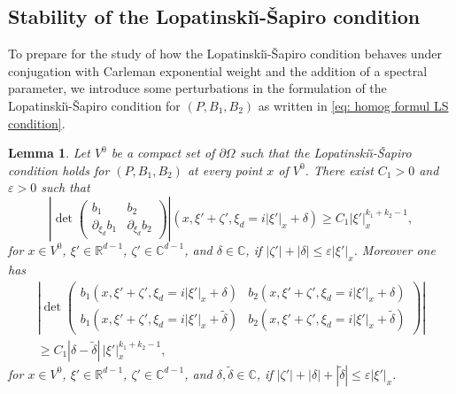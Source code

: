 \documentclass[10pt]{amsart}
\theoremstyle{plain}
\newtheorem{lemma}[theorem]{Lemma}
\theoremstyle{definition}
\def\R{\mathbb{R}}
\def\C{\mathbb{C}}
\newcommand{\LS}{Lopatinski\u{\i}-\v{S}apiro\xspace}
\let\eps\varepsilon
\begin{document}
\subsection{Stability of the \LS condition}
\label{sec: Stability LS}
To prepare for the study of how the \LS condition behaves under
conjugation with Carleman exponential weight and the addition of a
spectral parameter, we introduce some perturbations in the formulation
of the \LS condition for $(P, B_1, B_2)$ as written in \eqref{eq:
homog formul LS condition}.

\begin{lemma}
\label{lemma: perturbation LS}
Let $V^0$ be a compact set of $\partial\Omega$ such that the \LS
condition holds for $(P, B_1, B_2)$ at every point $x$ of $V^0$. There exist $C_1>0$
and $\eps>0$ such that
\begin{equation}\label{eq: LS + perturbation-1}
\left|\det
\begin{pmatrix}
b_1
&b_2\\[
2pt]
\partial_{\xi_d}b_1
& \partial_{\xi_d}b_2
\end{pmatrix}\right|(x,\xi' + \zeta', \xi_d = i |\xi'|_x+ \delta)
\geq C_1 |\xi'|_x^{k_1+k_2 -1},
\end{equation}
for $x \in V^0$, $\xi' \in \R^{d-1}$, $\zeta' \in \C^{d-1}$, and $\delta \in \C$, if $|\zeta'| + |\delta| \leq \eps |\xi'|_x$.
Moreover one has
\begin{multline}\label{eq: LS + perturbation-2}
\left|\det
\begin{pmatrix}
b_1 (x,\xi' + \zeta', \xi_d = i |\xi'|_x+ \delta)
&b_2 (x,\xi' + \zeta', \xi_d = i |\xi'|_x+ \delta)\\[
4pt]
b_1 (x,\xi' + \zeta', \xi_d = i |\xi'|_x+ \tilde{\delta})
& b_2 (x,\xi' + \zeta', \xi_d = i |\xi'|_x+ \tilde{\delta})
\end{pmatrix}\right|\\
\geq C_1 |\delta - \tilde{\delta}|\, |\xi'|_x^{k_1+k_2 -1},
\end{multline}
for $x \in V^0$, $\xi' \in \R^{d-1}$, $\zeta' \in \C^{d-1}$, and $\delta, \tilde{\delta}\in \C$,
if $|\zeta'| + |\delta| + |\tilde{\delta}|\leq \eps |\xi'|_x$.
\end{lemma}
\end{document}
